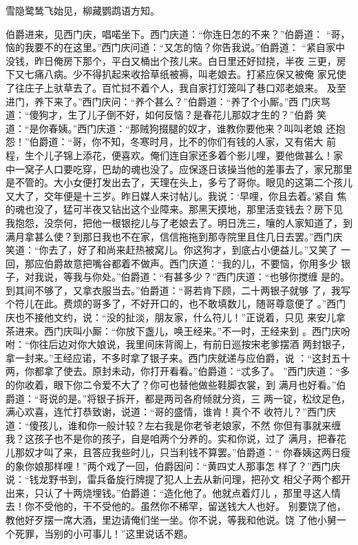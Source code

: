 雪隐鹭鸶飞始见，柳藏鹦鹉语方知。

伯爵进来，见西门庆，唱喏坐下。西门庆道：“你连日怎的不来？”伯爵道：
“哥，恼的我要不的在这里。”西门庆问道：“又怎的恼？你告我说。”伯爵道：
“紧自家中没钱，昨日俺房下那个，平白又桶出个孩儿来。白日里还好挝挠，半夜
三更，房下又七痛八病。少不得扒起来收拾草纸被褥，叫老娘去。打紧应保又被俺
家兄使了往庄子上驮草去了。百忙挝不着个人，我自家打灯笼叫了巷口邓老娘来。
及至进门，养下来了。”西门庆问：“养个甚么？”伯爵道：“养了个小厮。”西
门庆骂道：“傻狗才，生了儿子倒不好，如何反恼？是春花儿那奴才生的？”伯爵
笑道：“是你春姨。”西门庆道：“那贼狗掇腿的奴才，谁教你要他来？叫叫老娘
还抱怨！”伯爵道：“哥，你不知，冬寒时月，比不的你们有钱的人家，又有偌大
前程，生个儿子锦上添花，便喜欢。俺们连自家还多着个影儿哩，要他做甚么！家
中一窝子人口要吃穿，巴劫的魂也没了。应保逐日该操当他的差事去了，家兄那里
是不管的。大小女便打发出去了，天理在头上，多亏了哥你。眼见的这第二个孩儿
又大了，交年便是十三岁。昨日媒人来讨帖儿。我说：‘早哩，你且去着。’紧自
焦的魂也没了，猛可半夜又钻出这个业障来。那黑天摸地，那里活变钱去？房下见
我抱怨，没奈何，把他一根银挖儿与了老娘去了。明日洗三，嚷的人家知道了，到
满月拿甚么使？到那日我也不在家，信信拖拖到那寺院里且住几日去罢。”西门庆
笑道：“你去了，好了和尚来赶热被窝儿。你这狗才，到底占小便益儿。”又笑了
一回，那应伯爵故意把嘴谷都着不做声。西门庆道：“我的儿，不要恼，你用多少
银子，对我说，等我与你处。”伯爵道：“有甚多少？”西门庆道：“也够你搅缠
是的。到其间不够了，又拿衣服当去。”伯爵道：“哥若肯下顾，二十两银子就够
了，我写个符儿在此。费烦的哥多了，不好开口的，也不敢填数儿，随哥尊意便了
。”西门庆也不接他文约，说：“没的扯淡，朋友家，什么符儿！”正说着，只见
来安儿拿茶进来。西门庆叫小厮：“你放下盏儿，唤王经来。”不一时，王经来到
。西门庆吩咐：“你往后边对你大娘说，我里间床背阁上，有前日巡按宋老爹摆酒
两封银子，拿一封来。”王经应诺，不多时拿了银子来。西门庆就递与应伯爵，说
：“这封五十两，你都拿了使去。原封未动，你打开看看。”伯爵道：“忒多了。
”西门庆道：“多的你收着，眼下你二令爱不大了？你可也替他做些鞋脚衣裳，到
满月也好看。”伯爵道：“哥说的是。”将银子拆开，都是两司各府倾就分资，三
两一锭，松纹足色，满心欢喜，连忙打恭致谢，说道：“哥的盛情，谁肯！真个不
收符儿？”西门庆道：“傻孩儿，谁和你一般计较？左右我是你老爷老娘家，不然
你但有事就来缠我？这孩子也不是你的孩子，自是咱两个分养的。实和你说，过了
满月，把春花儿那奴才叫了来，且答应我些时儿，只当利钱不算罢。”伯爵道：“
你春姨这两日瘦的象你娘那样哩！”两个戏了一回，伯爵因问：“黄四丈人那事怎
样了？”西门庆说：“钱龙野书到，雷兵备旋行牌提了犯人上去从新问理，把孙文
相父子两个都开出来，只认了十两烧埋钱。”伯爵道：“造化他了。他就点着灯儿
，那里寻这人情去！你不受他的，干不受他的。虽然你不稀罕，留送钱大人也好。
别要饶了他，教他好歹摆一席大酒，里边请俺们坐一坐。你不说，等我和他说。饶
了他小舅一个死罪，当别的小可事儿！”这里说话不题。

